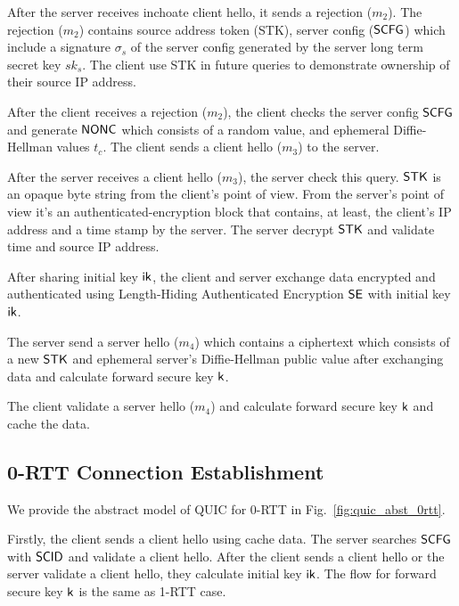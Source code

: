 After the server receives inchoate client hello, it
sends a rejection ($m_2$). The rejection ($m_2$) contains
source address token (STK), server config ($\mathsf{SCFG}$) which
include a signature $\sigma_s$ of the server config generated
by the server long term secret key $sk_s$. The client use
STK in future queries to demonstrate ownership of their
source IP address.

After the client receives a rejection ($m_2$), the client
checks the server config $\mathsf{SCFG}$ and generate $\mathsf{NONC}$ which consists
of a random value, and ephemeral
Diffie-Hellman values $t_c$.
The client sends a client hello ($m_3$) to the server.

After the server receives a client hello ($m_3$), the
server check this query. $\mathsf{STK}$ is an opaque byte string
from the client's point of view. From the server's point
of view it's an authenticated-encryption block that
contains, at least, the client's IP address and a time
stamp by the server. The server decrypt $\mathsf{STK}$ and
validate time and source IP address.

After sharing initial key $\mathsf{ik}$, the client and server
exchange data encrypted and authenticated using Length-Hiding
Authenticated Encryption $\mathsf{SE}$ with initial key $\mathsf{ik}$.

The server send a server hello ($m_4$) which contains
a ciphertext which consists of a new $\mathsf{STK}$ and ephemeral server's
Diffie-Hellman public value after exchanging data and
calculate forward secure key $\mathsf{k}$.

The client validate a server hello ($m_4$) and calculate
forward secure key $\mathsf{k}$ and cache the data.

\subsection{0-RTT Connection Establishment} \label{sec:quic_0rtt}

We provide the abstract model of QUIC for 0-RTT in
Fig.~\ref{fig:quic_abst_0rtt}.
%

%
Firstly, the client sends a client hello using cache data.
The server searches $\mathsf{SCFG}$ with $\mathsf{SCID}$ and validate a
client hello.
After the client sends a client hello or the server validate
a client hello, they calculate initial key $\mathsf{ik}$.
The flow for forward secure key $\mathsf{k}$ is the same as
1-RTT case.


